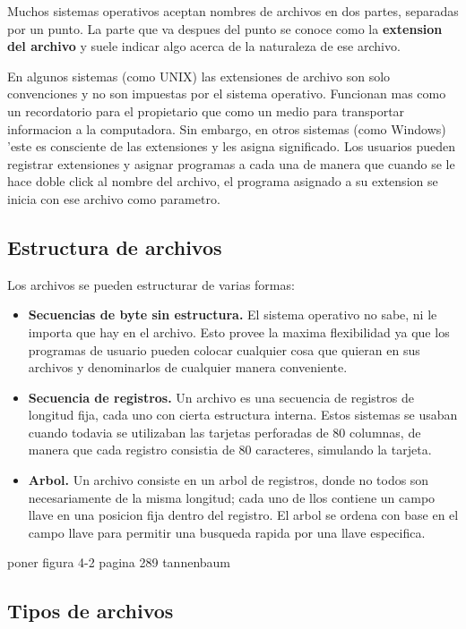 \documentclass[12pt]{article}
\begin{document}
  Muchos sistemas operativos aceptan nombres de archivos en dos partes, separadas por un punto. La parte que va despues del punto se conoce como la \textbf{extension del archivo} y suele indicar algo acerca de la naturaleza de ese archivo.
  
  En algunos sistemas (como UNIX) las extensiones de archivo son solo convenciones y no son impuestas por el sistema operativo. Funcionan mas como un recordatorio para el propietario que como un medio para transportar informacion a la computadora. Sin embargo, en otros sistemas (como Windows) 'este es consciente de las extensiones y les asigna significado. Los usuarios pueden registrar extensiones y asignar programas a cada una de manera que cuando se le hace doble click al nombre del archivo, el programa asignado a su extension se inicia con ese archivo como parametro.

  \subsection{Estructura de archivos}
  Los archivos se pueden estructurar de varias formas:
  \begin{itemize}
    \item \textbf{Secuencias de byte sin estructura.} El sistema operativo no sabe, ni le importa que hay en el archivo. Esto provee la maxima flexibilidad ya que los programas de usuario pueden colocar cualquier cosa que quieran en sus archivos y denominarlos de cualquier manera conveniente.

    \item \textbf{Secuencia de registros.} Un archivo es una secuencia de registros de longitud fija, cada uno con cierta estructura interna. Estos sistemas se usaban cuando todavia se utilizaban las tarjetas perforadas de 80 columnas, de manera que cada registro consistia de 80 caracteres, simulando la tarjeta.

    \item \textbf{Arbol.} Un archivo consiste en un arbol de registros, donde no todos son necesariamente de la misma longitud; cada uno de llos contiene un campo llave en una posicion fija dentro del registro. El arbol se ordena con base en el campo llave para permitir una busqueda rapida por una llave especifica.
  \end{itemize} 

  poner figura 4-2 pagina 289 tannenbaum

  \subsection{Tipos de archivos}

  


  

  \newpage
  \printbibliography
\end{document}
